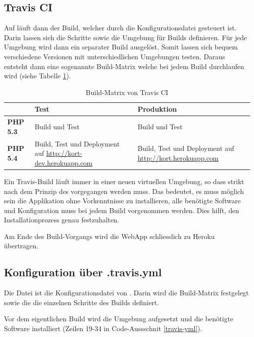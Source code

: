 \subsection{Travis CI}
Auf  läuft dann der Build, welcher durch die Konfigurationsdatei  gesteuert ist. Darin lassen sich die Schritte sowie die Umgebung für Builds definieren.
Für jede Umgebung wird dann ein separater Build ausgelöst.
Somit lassen sich bequem verschiedene Versionen mit unterschiedlichen Umgebungen testen.
Daraus entsteht dann eine sogenannte Build-Matrix welche bei jedem Build durchlaufen wird (siehe Tabelle \ref{infrastruktur-build-matrix}).

\begin{table}[H]
\centering
\begin{tabular}{|p{0.15\threecelltabwidth}|p{0.425\threecelltabwidth}|p{0.425\threecelltabwidth}|}
\hline 
 & \textbf{Test} & \textbf{Produktion} \\
\hline 
\textbf{PHP 5.3} & Build und Test & Build und Test \\
\hline 
\textbf{PHP 5.4} & Build, Test und Deployment auf \url{http://kort-dev.herokuapp.com} & Build, Test und Deployment auf \url{http://kort.herokuapp.com} \\
\hline 
\end{tabular} 
\caption{Build-Matrix von Travis CI}
\label{infrastruktur-build-matrix}
\end{table}

Ein Travis-Build läuft immer in einer neuen virtuellen Umgebung, so dass strikt nach dem Prinzip des \emph{} vorgegangen werden muss.
Das bedeutet, es muss möglich sein die Applikation ohne Vorkenntnisse zu installieren, alle benötigte Software und Konfiguration muss bei jedem Build vorgenommen werden.
Dies hilft, den Installationprozess genau festzuhalten.

Am Ende des Build-Vorgangs wird die \gls{WebApp} schliesslich zu Heroku übertragen.

\subsection{Konfiguration über .travis.yml}
Die  Datei ist die Konfigurationsdatei von .
Darin wird die Build-Matrix festgelegt sowie die die einzelnen Schritte des Builds definiert.

Vor dem eigentlichen Build wird die Umgebung aufgesetzt und die benötigte Software installiert (Zeilen 19-34 in Code-Aussschnit \ref{travis-yml}).


